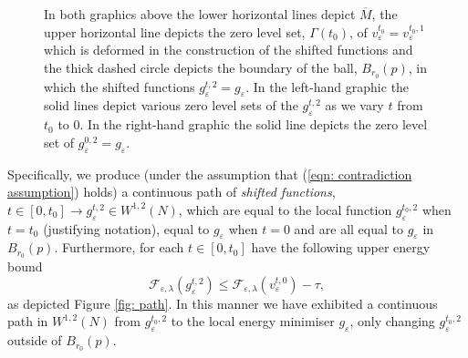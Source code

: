 \documentclass[11pt]{article}
\begin{document}
\begin{figure}[H]
\hspace{1mm}
\caption{In both graphics above the lower horizontal lines depict $\overline{M}$, the upper horizontal line depicts the zero level set, $\Gamma(t_0)$, of $v^{t_0}_\varepsilon = v^{t_0,1}_\varepsilon$ which is deformed in the construction of the shifted functions and the thick dashed circle depicts the boundary of the ball, $B_{r_0}(p)$, in which the shifted functions $g^{t,2}_\varepsilon = g_\varepsilon$. In the left-hand graphic the solid lines depict various zero level sets of the $g^{t,2}_\varepsilon$ as we vary $t$ from $t_0$ to $0$. In the right-hand graphic the solid line depicts the zero level set of $g^{0,2}_\varepsilon = g_\varepsilon$.}
\label{fig: shifting functions II}
\end{figure}
Specifically, we produce (under the assumption that (\ref{eqn: contradiction assumption}) holds) a continuous path of \textit{shifted functions}, $t \in [0,t_0] \rightarrow g^{t,2}_\varepsilon \in W^{1,2}(N)$, which are equal to the local function $g^{t_0,2}_\varepsilon$ when $t = t_0$ (justifying notation), equal to $g_\varepsilon$ when $t = 0$ and are all equal to $g_\varepsilon$ in $B_{r_0}(p)$. Furthermore, for each $t \in [0,t_0]$ have the following upper energy bound
\begin{equation*}
    \mathcal{F}_{\varepsilon,\lambda}(g^{t,2}_\varepsilon) \leq \mathcal{F}_{\varepsilon,\lambda}(v^{t,0}_\varepsilon) - \tau,
\end{equation*}
as depicted Figure \ref{fig: path}. In this manner we have exhibited a continuous path in $W^{1,2}(N)$ from $g^{t_0,2}_\varepsilon$ to the local energy minimiser $g_\varepsilon$, only changing $g^{t_0,2}_\varepsilon$ outside of $B_{r_0}(p)$.
\end{document}
